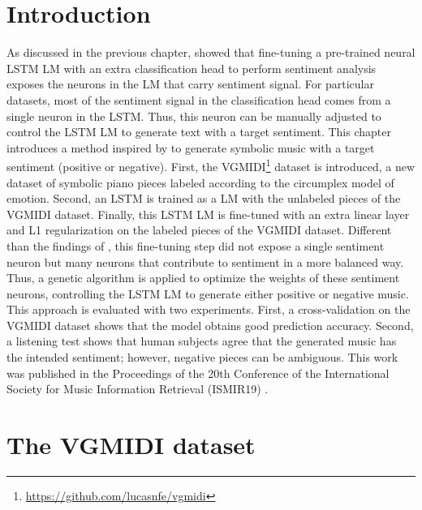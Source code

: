 \section{Introduction}

As discussed in the previous chapter, \citet{radford_2017} showed that fine-tuning a pre-trained neural LSTM LM with an extra classification head to perform sentiment analysis exposes the neurons in the LM that carry sentiment signal. For particular datasets, most of the sentiment signal in the classification head comes from a single neuron in the LSTM. Thus, this neuron can be manually adjusted to control the LSTM LM to generate text with a target sentiment. This chapter introduces a method inspired by \citet{radford_2017} to generate symbolic music with a target sentiment (positive or negative). First, the VGMIDI\footnote{\url{https://github.com/lucasnfe/vgmidi}} dataset is introduced, a new dataset of symbolic piano pieces labeled according to the circumplex model of emotion. Second, an LSTM is trained as a LM with the unlabeled pieces of the VGMIDI dataset. Finally, this LSTM LM is fine-tuned with an extra linear layer and L1 regularization on the labeled pieces of the VGMIDI dataset. Different than the findings of \citet{radford_2017}, this fine-tuning step did not expose a single sentiment neuron but many neurons that contribute to sentiment in a more balanced way. Thus, a genetic algorithm is applied to optimize the weights of these sentiment neurons, controlling the LSTM LM to generate either positive or negative music. This approach is evaluated with two experiments. First, a cross-validation on the VGMIDI dataset shows that the model obtains good prediction accuracy. Second, a listening test shows that human subjects agree that the generated music has the intended sentiment; however, negative pieces can be ambiguous. This work was published in the Proceedings of the 20th Conference of the International Society for Music Information Retrieval (ISMIR19) \cite{ferreira_2019}.

\section{The VGMIDI dataset}

